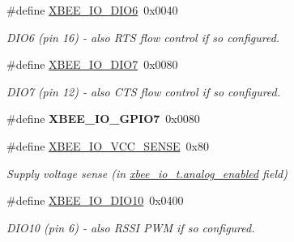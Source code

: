 \begin{DoxyCompactItemize}
\mbox{\label{group__xbee__io_ga1e1b537e3a643c8f79098d8f490f433e}} 
\#define \hyperlink{group__xbee__io_ga1e1b537e3a643c8f79098d8f490f433e}{X\+B\+E\+E\+\_\+\+I\+O\+\_\+\+D\+I\+O6}~0x0040
\begin{DoxyCompactList}\small\item\em D\+I\+O6 (pin 16) -\/ also R\+TS flow control if so configured. \end{DoxyCompactList}\item 
\mbox{\label{group__xbee__io_ga6255aa73ee149d14f2adb45112124dc1}} 
\#define \hyperlink{group__xbee__io_ga6255aa73ee149d14f2adb45112124dc1}{X\+B\+E\+E\+\_\+\+I\+O\+\_\+\+D\+I\+O7}~0x0080
\begin{DoxyCompactList}\small\item\em D\+I\+O7 (pin 12) -\/ also C\+TS flow control if so configured. \end{DoxyCompactList}\item 
\mbox{\label{group__xbee__io_gaa33d3e911aa351342fb8a28a0bdae41f}} 
\#define {\bfseries X\+B\+E\+E\+\_\+\+I\+O\+\_\+\+G\+P\+I\+O7}~0x0080
\item 
\mbox{\label{group__xbee__io_gae8044e1e12773287a7d433b23bba560b}} 
\#define \hyperlink{group__xbee__io_gae8044e1e12773287a7d433b23bba560b}{X\+B\+E\+E\+\_\+\+I\+O\+\_\+\+V\+C\+C\+\_\+\+S\+E\+N\+SE}~0x80
\begin{DoxyCompactList}\small\item\em Supply voltage sense (in \hyperlink{group__xbee__io_ga8473837f97f54ee29f09cd8f9c15e084}{xbee\+\_\+io\+\_\+t.\+analog\+\_\+enabled} field) \end{DoxyCompactList}\item 
\mbox{\label{group__xbee__io_gaf960c0d984f3b75ecfcae16ccbb5f3b8}} 
\#define \hyperlink{group__xbee__io_gaf960c0d984f3b75ecfcae16ccbb5f3b8}{X\+B\+E\+E\+\_\+\+I\+O\+\_\+\+D\+I\+O10}~0x0400
\begin{DoxyCompactList}\small\item\em D\+I\+O10 (pin 6) -\/ also R\+S\+SI P\+WM if so configured. \end{DoxyCompactList}\item 
\mbox{\label{group__xbee__io_ga7c1e80d3412af7f1218b981c5c4e3702}} 

\end{DoxyCompactItemize}

